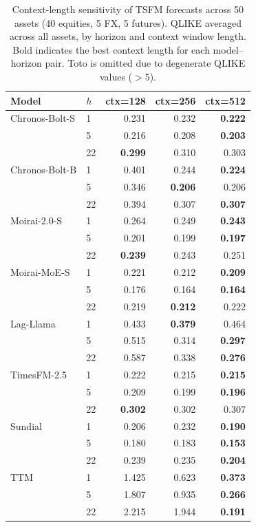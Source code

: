 \begin{table}[H]
\centering
\singlespacing
\caption{Context-length sensitivity of TSFM forecasts across 50 assets (40 equities, 5 FX, 5 futures). QLIKE averaged across all assets, by horizon and context window length. Bold indicates the best context length for each model--horizon pair. Toto is omitted due to degenerate QLIKE values ($> 5$).}
\label{tab:context_sensitivity}
\small
\begin{tabular}{llrrr}
\toprule
Model & $h$ & ctx=128 & ctx=256 & ctx=512 \\
\midrule
Chronos-Bolt-S & 1 & 0.231 & 0.232 & \textbf{0.222} \\
 & 5 & 0.216 & 0.208 & \textbf{0.203} \\
 & 22 & \textbf{0.299} & 0.310 & 0.303 \\
\addlinespace
Chronos-Bolt-B & 1 & 0.401 & 0.244 & \textbf{0.224} \\
 & 5 & 0.346 & \textbf{0.206} & 0.206 \\
 & 22 & 0.394 & 0.307 & \textbf{0.307} \\
\addlinespace
Moirai-2.0-S & 1 & 0.264 & 0.249 & \textbf{0.243} \\
 & 5 & 0.201 & 0.199 & \textbf{0.197} \\
 & 22 & \textbf{0.239} & 0.243 & 0.251 \\
\addlinespace
Moirai-MoE-S & 1 & 0.221 & 0.212 & \textbf{0.209} \\
 & 5 & 0.176 & 0.164 & \textbf{0.164} \\
 & 22 & 0.219 & \textbf{0.212} & 0.222 \\
\addlinespace
Lag-Llama & 1 & 0.433 & \textbf{0.379} & 0.464 \\
 & 5 & 0.515 & 0.314 & \textbf{0.297} \\
 & 22 & 0.587 & 0.338 & \textbf{0.276} \\
\addlinespace
TimesFM-2.5 & 1 & 0.222 & 0.215 & \textbf{0.215} \\
 & 5 & 0.209 & 0.199 & \textbf{0.196} \\
 & 22 & \textbf{0.302} & 0.302 & 0.307 \\
\addlinespace
Sundial & 1 & 0.206 & 0.232 & \textbf{0.190} \\
 & 5 & 0.180 & 0.183 & \textbf{0.153} \\
 & 22 & 0.239 & 0.235 & \textbf{0.204} \\
\addlinespace
TTM & 1 & 1.425 & 0.623 & \textbf{0.373} \\
 & 5 & 1.807 & 0.935 & \textbf{0.266} \\
 & 22 & 2.215 & 1.944 & \textbf{0.191} \\
\bottomrule
\end{tabular}
\end{table}